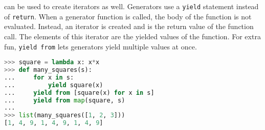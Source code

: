  can be used to create iterators as well. Generators use a
\texttt{yield} statement instead of \texttt{return}. When a generator function
is called, the body of the function is not evaluated. Instead, an iterator is
created and is the return value of the function call. The elements of this
iterator are the yielded values of the function. For extra fun, \texttt{yield from}
lets generators yield multiple values at once.

\vspace{1em}
\begin{lstlisting}[language=Python]
>>> square = lambda x: x*x
>>> def many_squares(s):
...     for x in s:
...         yield square(x)
...     yield from [square(x) for x in s]
...     yield from map(square, s)
...
>>> list(many_squares([1, 2, 3]))
[1, 4, 9, 1, 4, 9, 1, 4, 9]
\end{lstlisting}
